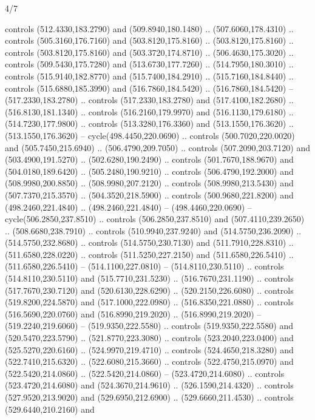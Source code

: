 \begin{flagdescription}{4/7}
\begin{scope}[shift={(0.5\flaglength,0.5\flagwidth)},scale=\flagwidth*\stretchfactor/820]
\begin{scope}[scale=1.87,xshift=-138mm,yshift=75mm]
\begin{scope}[y=0.8pt, x=0.8pt, yscale=-1, xscale=1]
\begin{scope}[fill=cd2a567]
  controls (512.4330,183.2790) and (509.8940,180.1480) .. (507.6060,178.4310) ..
  controls (505.3160,176.7160) and (503.8120,175.8160) .. (503.8120,175.8160) ..
  controls (503.8120,175.8160) and (503.3720,174.8710) .. (506.4630,175.3020) ..
  controls (509.5430,175.7280) and (513.6730,177.7260) .. (514.7950,180.3010) ..
  controls (515.9140,182.8770) and (515.7400,184.2910) .. (515.7160,184.8440) ..
  controls (515.6880,185.3990) and (516.7860,184.5420) .. (516.7860,184.5420) --
  (517.2330,183.2780) .. controls (517.2330,183.2780) and (517.4100,182.2680) ..
  (516.8130,181.1340) .. controls (516.2160,179.9970) and (516.1130,179.6180) ..
  (514.7230,177.9800) .. controls (513.3280,176.3360) and (513.1550,176.3620) ..
  (513.1550,176.3620) -- cycle(498.4450,220.0690) .. controls
  (500.7020,220.0020) and (505.7450,215.6940) .. (506.4790,209.7050) .. controls
  (507.2090,203.7120) and (503.4900,191.5270) .. (502.6280,190.2490) .. controls
  (501.7670,188.9670) and (504.0180,189.6420) .. (505.2480,190.9210) .. controls
  (506.4790,192.2000) and (508.9980,200.8850) .. (508.9980,207.2120) .. controls
  (508.9980,213.5430) and (507.7370,215.3570) .. (504.3520,218.5900) .. controls
  (500.9680,221.8200) and (498.2460,221.4840) .. (498.2460,221.4840) --
  (498.4460,220.0690) -- cycle(506.2850,237.8510) .. controls
  (506.2850,237.8510) and (507.4110,239.2650) .. (508.6680,238.7910) .. controls
  (510.9940,237.9240) and (514.5750,236.2090) .. (514.5750,232.8680) .. controls
  (514.5750,230.7130) and (511.7910,228.8310) .. (511.6580,228.0220) .. controls
  (511.5250,227.2150) and (511.6580,226.5410) .. (511.6580,226.5410) --
  (514.1100,227.0810) -- (514.8110,230.5110) .. controls (514.8110,230.5110) and
  (515.7710,231.5230) .. (516.7670,231.1190) .. controls (517.7670,230.7120) and
  (520.6130,228.6290) .. (520.2150,226.6080) .. controls (519.8200,224.5870) and
  (517.1000,222.0980) .. (516.8350,221.0880) .. controls (516.5690,220.0760) and
  (516.8990,219.2020) .. (516.8990,219.2020) -- (519.2240,219.6060) --
  (519.9350,222.5580) .. controls (519.9350,222.5580) and (520.5470,223.5790) ..
  (521.8770,223.3080) .. controls (523.2040,223.0400) and (525.5270,220.6160) ..
  (524.9970,219.4710) .. controls (524.4650,218.3280) and (522.7410,215.6320) ..
  (522.6080,215.3660) .. controls (522.4750,215.0970) and (522.5420,214.0860) ..
  (522.5420,214.0860) -- (523.4720,214.6080) .. controls (523.4720,214.6080) and
  (524.3670,214.9610) .. (526.1590,214.4320) .. controls (527.9520,213.9020) and
  (529.6950,212.6900) .. (529.6660,211.4530) .. controls (529.6440,210.2160) and

\end{scope}
\end{scope}
\end{scope}
\end{scope}
\end{flagdescription}
